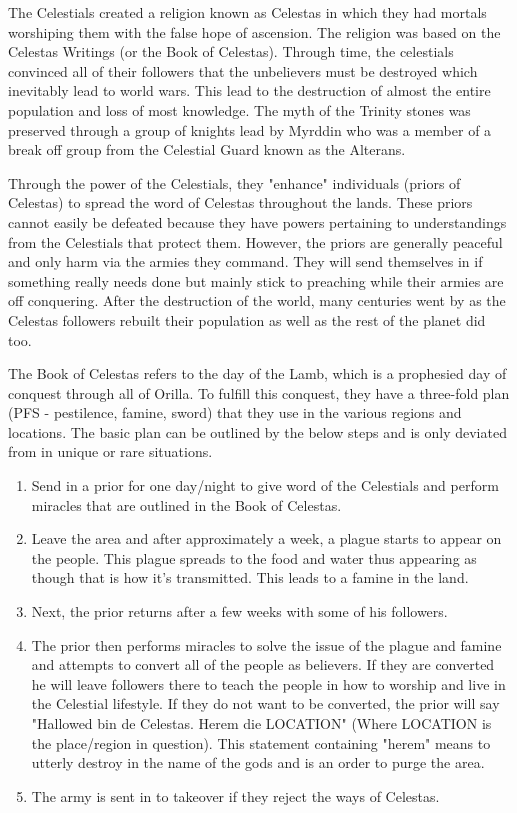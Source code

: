 The Celestials created a religion known as Celestas in which they had mortals worshiping them with the false hope of ascension. The religion was based on the Celestas Writings (or the Book of Celestas). Through time, the celestials convinced all of their followers that the unbelievers must be destroyed which inevitably lead to world wars. This lead to the destruction of almost the entire population and loss of most knowledge. The myth of the Trinity stones was preserved through a group of knights lead by Myrddin who was a member of a break off group from the Celestial Guard known as the Alterans. 

Through the power of the Celestials, they "enhance" individuals (priors of Celestas) to spread the word of Celestas throughout the lands. These priors cannot easily be defeated because they have powers pertaining to understandings from the Celestials that protect them. However, the priors are generally peaceful and only harm via the armies they command. They will send themselves in if something really needs done but mainly stick to preaching while their armies are off conquering. After the destruction of the world, many centuries went by as the Celestas followers rebuilt their population as well as the rest of the planet did too.

The Book of Celestas refers to the day of the Lamb, which is a prophesied day of conquest through all of Orilla. To fulfill this conquest, they have a three-fold plan (PFS - pestilence, famine, sword) that they use in the various regions and locations. The basic plan can be outlined by the below steps and is only deviated from in unique or rare situations.

\begin{enumerate}
	\item Send in a prior for one day/night to give word of the Celestials and perform miracles that are outlined in the Book of Celestas.
	\item Leave the area and after approximately a week, a plague starts to appear on the people. This plague spreads to the food and water thus appearing as though that is how it's transmitted. This leads to a famine in the land.
	\item Next, the prior returns after a few weeks with some of his followers.
	\item The prior then performs miracles to solve the issue of the plague and famine and attempts to convert all of the people as believers. If they are converted he will leave followers there to teach the people in how to worship and live in the Celestial lifestyle. If they do not want to be converted, the prior will say "Hallowed bin de Celestas. Herem die LOCATION" (Where LOCATION is the place/region in question). This statement containing "herem" means to utterly destroy in the name of the gods and is an order to purge the area.
	\item The army is sent in to takeover if they reject the ways of Celestas.
\end{enumerate}

